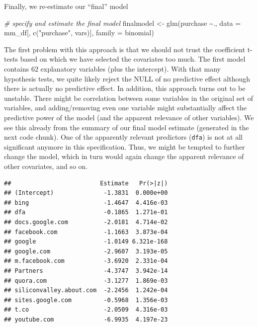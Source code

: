 \documentclass[
  12pt,
]{style/krantz}
\newenvironment{Shaded}{\begin{snugshade}}{\end{snugshade}}
\newcommand{\AttributeTok}[1]{\textcolor[rgb]{0.77,0.63,0.00}{#1}}
\newcommand{\CommentTok}[1]{\textcolor[rgb]{0.56,0.35,0.01}{\textit{#1}}}
\newcommand{\FunctionTok}[1]{\textcolor[rgb]{0.00,0.00,0.00}{#1}}
\newcommand{\NormalTok}[1]{#1}
\newcommand{\OtherTok}[1]{\textcolor[rgb]{0.56,0.35,0.01}{#1}}
\newcommand{\SpecialCharTok}[1]{\textcolor[rgb]{0.00,0.00,0.00}{#1}}
\newcommand{\StringTok}[1]{\textcolor[rgb]{0.31,0.60,0.02}{#1}}
\begin{document}
Finally, we re-estimate our ``final'' model

\begin{Shaded}
\begin{Highlighting}[]
\CommentTok{\# specify and estimate the final model}
\NormalTok{finalmodel }\OtherTok{\textless{}{-}} \FunctionTok{glm}\NormalTok{(purchase }\SpecialCharTok{\textasciitilde{}}\NormalTok{.,}
                  \AttributeTok{data =}\NormalTok{ mm\_df[, }\FunctionTok{c}\NormalTok{(}\StringTok{"purchase"}\NormalTok{, vars)], }
                  \AttributeTok{family =}\NormalTok{ binomial)}
\end{Highlighting}
\end{Shaded}

The first problem with this approach is that we should not trust the coefficient t-tests based on which we have selected the covariates too much. The first model contains 62 explanatory variables (plus the intercept). With that many hypothesis tests, we quite likely reject the NULL of no predictive effect although there is actually no predictive effect. In addition, this approach turns out to be unstable. There might be correlation between some variables in the original set of variables, and adding/removing even one variable might substantially affect the predictive power of the model (and the apparent relevance of other variables). We see this already from the summary of our final model estimate (generated in the next code chunk). One of the apparently relevant predictors (\texttt{dfa}) is not at all significant anymore in this specification. Thus, we might be tempted to further change the model, which in turn would again change the apparent relevance of other covariates, and so on.

\begin{Shaded}
\end{Shaded}

\begin{verbatim}
##                         Estimate   Pr(>|z|)
## (Intercept)              -1.3831  0.000e+00
## bing                     -1.4647  4.416e-03
## dfa                      -0.1865  1.271e-01
## docs.google.com          -2.0181  4.714e-02
## facebook.com             -1.1663  3.873e-04
## google                   -1.0149 6.321e-168
## google.com               -2.9607  3.193e-05
## m.facebook.com           -3.6920  2.331e-04
## Partners                 -4.3747  3.942e-14
## quora.com                -3.1277  1.869e-03
## siliconvalley.about.com  -2.2456  1.242e-04
## sites.google.com         -0.5968  1.356e-03
## t.co                     -2.0509  4.316e-03
## youtube.com              -6.9935  4.197e-23
\end{verbatim}
\end{document}
